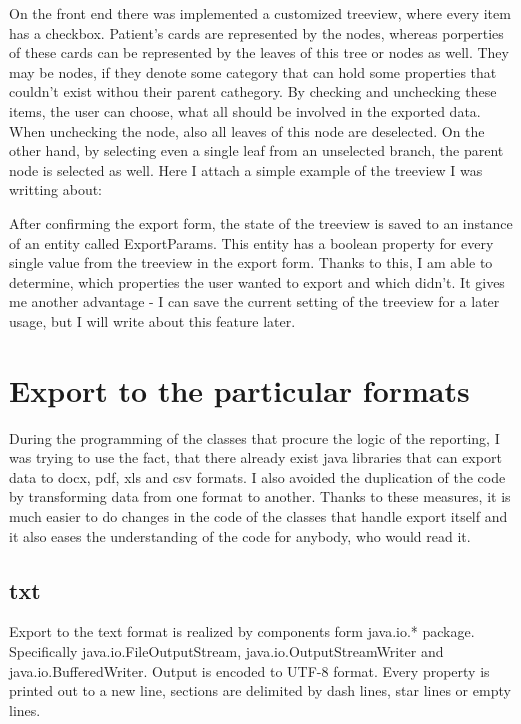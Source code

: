 \documentclass[thesis=B,english]{FITthesis}[2012/10/20]
\begin{document}
On the front end there was implemented a customized treeview, where every item has a checkbox. Patient's cards are represented by the nodes, whereas porperties of these cards can be represented by the leaves of this tree or nodes as well. They may be nodes, if they denote some category that can hold some properties that couldn't exist withou their parent cathegory. By checking and unchecking these items, the user can choose, what all should be involved in the exported data. When unchecking the node, also all leaves of this node are deselected. On the other hand, by selecting even a single leaf from an unselected branch, the parent node is selected as well.
Here I attach a simple example of the treeview I was writting about:




After confirming the export form, the state of the treeview is saved to an instance of an entity called ExportParams. This entity has a boolean property for every single value from the treeview in the export form. Thanks to this, I am able to determine, which properties the user wanted to export and which didn't. It gives me another advantage - I can save the current setting of the treeview for a later usage, but I will write about this feature later.

\section{Export to the particular formats}
During the  programming of the classes that procure the logic of the reporting, I was trying to use the fact, that there already exist java libraries that can export data to docx, pdf, xls and csv formats. I also avoided the duplication of the code by transforming data from one format to another. Thanks to these measures, it is much easier to do changes in the code of the classes that handle export itself and it also eases the understanding of the code for anybody, who would read it.
\subsection{txt}
Export to the text format is realized by components form java.io.* package. Specifically java.io.FileOutputStream, java.io.OutputStreamWriter and java.io.BufferedWriter. Output is encoded to UTF-8 format. Every property is printed out to a new line, sections are delimited by dash lines, star lines or empty lines.
\end{document}
